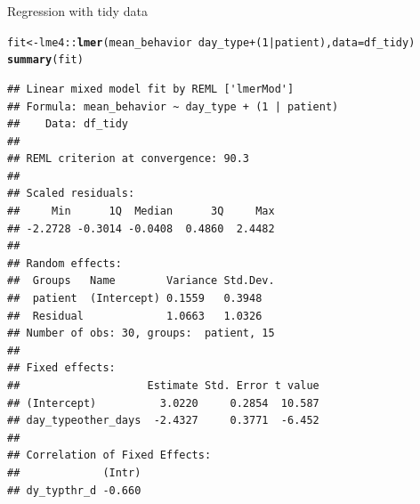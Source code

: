 \documentclass[10pt,handout]{beamer}\usepackage[]{graphicx}\usepackage[]{color}
\makeatletter
\newcommand{\hlnum}[1]{\textcolor[rgb]{0.686,0.059,0.569}{#1}}%
\newcommand{\hlopt}[1]{\textcolor[rgb]{0,0,0}{#1}}%
\newcommand{\hlstd}[1]{\textcolor[rgb]{0.345,0.345,0.345}{#1}}%
\newcommand{\hlkwb}[1]{\textcolor[rgb]{0.69,0.353,0.396}{#1}}%
\newcommand{\hlkwc}[1]{\textcolor[rgb]{0.333,0.667,0.333}{#1}}%
\newcommand{\hlkwd}[1]{\textcolor[rgb]{0.737,0.353,0.396}{\textbf{#1}}}%
\newenvironment{kframe}{%
 \def\at@end@of@kframe{}%
 \ifinner\ifhmode%
  \def\at@end@of@kframe{\end{minipage}}%
  \begin{minipage}{\columnwidth}%
 \fi\fi%
 \def\FrameCommand##1{\hskip\@totalleftmargin \hskip-\fboxsep
 \colorbox{shadecolor}{##1}\hskip-\fboxsep
     \hskip-\linewidth \hskip-\@totalleftmargin \hskip\columnwidth}%
 \MakeFramed {\advance\hsize-\width
   \@totalleftmargin\z@ \linewidth\hsize
   \@setminipage}}%
 {\par\unskip\endMakeFramed%
 \at@end@of@kframe}
\newenvironment{knitrout}{}{} %
\makeatother
\begin{document}
\begin{frame}[fragile]{Regression with tidy data}
	
	
\begin{knitrout}\tiny
{}\color{fgcolor}\begin{kframe}
\begin{alltt}
\hlstd{fit} \hlkwb{<-} \hlstd{lme4}\hlopt{::}\hlkwd{lmer}\hlstd{(mean_behavior} \hlopt{~} \hlstd{day_type} \hlopt{+} \hlstd{(}\hlnum{1}\hlopt{|}\hlstd{patient),} \hlkwc{data} \hlstd{= df_tidy)}
\hlkwd{summary}\hlstd{(fit)}
\end{alltt}
\begin{verbatim}
## Linear mixed model fit by REML ['lmerMod']
## Formula: mean_behavior ~ day_type + (1 | patient)
##    Data: df_tidy
## 
## REML criterion at convergence: 90.3
## 
## Scaled residuals: 
##     Min      1Q  Median      3Q     Max 
## -2.2728 -0.3014 -0.0408  0.4860  2.4482 
## 
## Random effects:
##  Groups   Name        Variance Std.Dev.
##  patient  (Intercept) 0.1559   0.3948  
##  Residual             1.0663   1.0326  
## Number of obs: 30, groups:  patient, 15
## 
## Fixed effects:
##                    Estimate Std. Error t value
## (Intercept)          3.0220     0.2854  10.587
## day_typeother_days  -2.4327     0.3771  -6.452
## 
## Correlation of Fixed Effects:
##             (Intr)
## dy_typthr_d -0.660
\end{verbatim}
\end{kframe}
\end{knitrout}
\end{frame}
\end{document}
